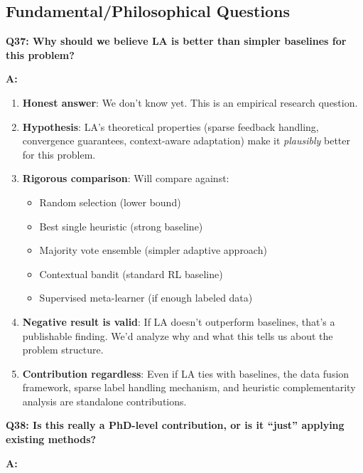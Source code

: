 \documentclass[11pt]{article}
\begin{document}
\subsection{Fundamental/Philosophical Questions}

\textbf{Q37: Why should we believe LA is better than simpler baselines for this problem?}

\textbf{A:}

\begin{enumerate}
    \item \textbf{Honest answer}: We don't know yet. This is an empirical research question.

    \item \textbf{Hypothesis}: LA's theoretical properties (sparse feedback handling, convergence guarantees, context-aware adaptation) make it \textit{plausibly} better for this problem.

    \item \textbf{Rigorous comparison}: Will compare against:
    \begin{itemize}
        \item Random selection (lower bound)
        \item Best single heuristic (strong baseline)
        \item Majority vote ensemble (simpler adaptive approach)
        \item Contextual bandit (standard RL baseline)
        \item Supervised meta-learner (if enough labeled data)
    \end{itemize}

    \item \textbf{Negative result is valid}: If LA doesn't outperform baselines, that's a publishable finding. We'd analyze why and what this tells us about the problem structure.

    \item \textbf{Contribution regardless}: Even if LA ties with baselines, the data fusion framework, sparse label handling mechanism, and heuristic complementarity analysis are standalone contributions.
\end{enumerate}

\textbf{Q38: Is this really a PhD-level contribution, or is it ``just'' applying existing methods?}

\textbf{A:}
\end{document}
